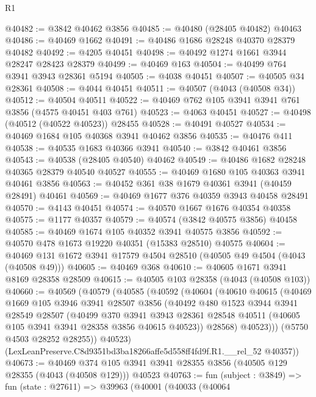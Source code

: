 \begin{lexlean}{R1}
\begin{coremodule}
@40482 := @3842 @40462 @3856
@40485 := @40480 (@28405 @40482) @40463
@40486 := @40469 @1662
@40491 := @40486 @1686 @28248 @40370 @28379 @40482
@40492 := @4205 @40451
@40498 := @40492 @1274 @1661 @3944 @28247 @28423 @28379
@40499 := @40469 @163
@40504 := @40499 @764 @3941 @3943 @28361 @5194
@40505 := @4038 @40451
@40507 := @40505 @34 @28361
@40508 := @4044 @40451
@40511 := @40507 (@4043 (@40508 @34))
@40512 := @40504 @40511
@40522 := @40469 @762 @105 @3941 @3941 @761 @3856 (@4575 @40451 @403 @761)
@40523 := @4063 @40451
@40527 := @40498 (@40512 (@40522 @40523)) @28455
@40528 := @40491 @40527
@40534 := @40469 @1684 @105 @40368 @3941 @40462 @3856
@40535 := @40476 @411
@40538 := @40535 @1683 @40366 @3941
@40540 := @3842 @40461 @3856
@40543 := @40538 (@28405 @40540) @40462
@40549 := @40486 @1682 @28248 @40365 @28379 @40540 @40527
@40555 := @40469 @1680 @105 @40363 @3941 @40461 @3856
@40563 := @40452 @361 @38 @1679 @40361 @3941 (@40459 @28491) @40461
@40569 := @40469 @1677 @376 @40359 @3943 @40458 @28491
@40570 := @4143 @40451
@40574 := @40570 @1667 @1676 @40354 @40358
@40575 := @1177 @40357
@40579 := @40574 (@3842 @40575 @3856) @40458
@40585 := @40469 @1674 @105 @40352 @3941 @40575 @3856
@40592 := @40570 @478 @1673 @19220 @40351 (@15383 @28510) @40575
@40604 := @40469 @131 @1672 @3941 @17579 @4504 @28510 (@40505 @49 @4504 (@4043 (@40508 @49)))
@40605 := @40469 @368
@40610 := @40605 @1671 @3941 @8169 @28358 @28509
@40615 := @40505 @103 @28358 (@4043 (@40508 @103))
@40660 := @40569
    (@40579
      (@40585
        (@40592
          (@40604
            (@40610
              @40615
              (@40469
                @1669
                @105
                @3946
                @3941
                @28507
                @3856
                (@40492
                  @480
                  @1523
                  @3944
                  @3941
                  @28549
                  @28507
                  (@40499
                    @370
                    @3941
                    @3943
                    @28361
                    @28548
                    @40511
                    (@40605 @105 @3941 @3941 @28358 @3856 @40615 @40523))
                  @28568)
                @40523)))
          (@5750 @4503 @28252 @28255))
        @40523)
      (LexLeanPreserve.C8d9351bd3ba18266affe5d558ff4fd9f.R1.__rel_52 @40357))
@40673 := @40469
    @374
    @105
    @3941
    @3941
    @28355
    @3856
    (@40505 @129 @28355 (@4043 (@40508 @129)))
    @40523
@40763 := fun (subject : @3849) =>
  fun (state : @27611) =>
  @39963
    (@40001
      (@40033
        (@40064

\end{coremodule}
\end{lexlean}
